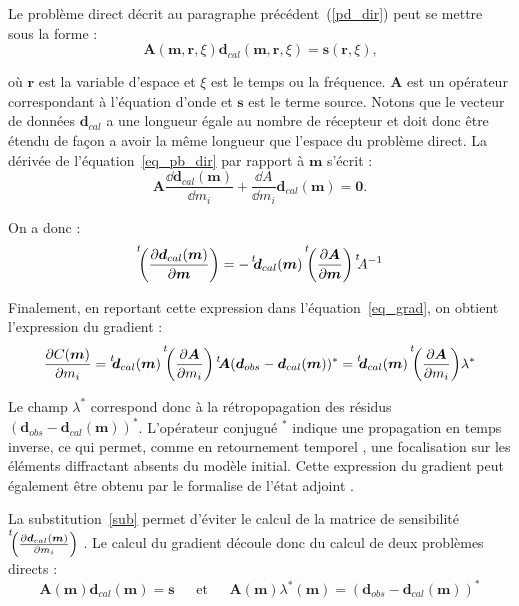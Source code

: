 Le problème direct décrit au paragraphe précédent~(\ref{pd_dir}) peut se mettre sous la forme :
\begin{equation}
	\bm{A}(\bm{m},\bm{r},\xi)\bm{d}_{cal}(\bm{m},\bm{r},\xi)=\bm{s}(\bm{r},\xi)\text{,}
	\label{eq_pb_dir}
\end{equation}

où $\bm{r}$ est la variable d'espace et $\xi$ est le temps ou la fréquence. $\bm{A}$ est un opérateur correspondant à l'équation d'onde et $\bm{s}$ est le terme source. Notons que le vecteur de données $\bm{d}_{cal}$ a une longueur égale au nombre de récepteur et doit donc être étendu de façon a avoir la même longueur que l'espace du problème direct. La dérivée de l'équation~\ref{eq_pb_dir} par rapport à $\bm{m}$ s'écrit : 
\begin{equation}
	\bm{A} \frac{\dd \bm{d}_{cal}(\bm{m})}{\dd m_{i}} + \frac{\dd A}{\dd m_{i}}\bm{d}_{cal}(\bm{m}) = \bm{0} \text{.}
\end{equation}

On a donc : 
\begin{equation}
	\tr{\left( \frac{\dd \bm{d}_{cal}(\bm{m})}{\dd \bm{m}}  \right)} = - \tr{\bm{d}_{cal}(\bm{m})} \tr{\left( \frac{\dd \bm{A}}{\dd \bm{m}} \right)} \tr{A^{-1}}
	\label{sub}
\end{equation} 	

Finalement, en reportant cette expression dans l'équation~\ref{eq_grad}, on obtient l'expression du gradient : 
\begin{equation}
	 \frac{\dd C (\bm{m})}{\dd m_{i}} = \tr{\bm{d}_{cal}(\bm{m})}  \tr{\left( \frac{\dd \bm{A}}{\dd m_{i}}\right)} \tr{\bm{A}} (\bm{d}_{obs} - \bm{d}_{cal}(\bm{m}))^* = \tr{\bm{d}_{cal}(\bm{m})} \tr{\left( \frac{\dd \bm{A}}{\dd m_{i}}\right)} \lambda^*
\end{equation}

Le champ $\lambda^*$ correspond donc à la rétropopagation des résidus $( \bm{d}_{obs} - \bm{d}_{cal}(\bm{m}))^*$. L'opérateur conjugué $^*$ indique une propagation en temps inverse, ce qui permet, comme en retournement temporel \citep{prada_2002}, une focalisation sur les éléments diffractant absents du modèle initial. Cette expression du gradient peut également être obtenu par le formalise de l'état adjoint \citep{plessix}.\\

La substitution~\ref{sub} permet d'éviter le calcul de la matrice de sensibilité $\tr{\left( \frac{\dd \bm{d}_{cal}(\bm{m}) }{\dd m_{i}} \right)}$ . Le calcul du gradient découle donc du calcul de deux problèmes directs : 
\begin{equation*}
	\bm{A}(\bm{m})\bm{d}_{cal}(\bm{m})=\bm{s} ~~~~~~~\text{et}~~~~~~~\bm{A}(\bm{m}) \lambda^*(\bm{m})=( \bm{d}_{obs} - \bm{d}_{cal}(\bm{m}))^*
\end{equation*}

